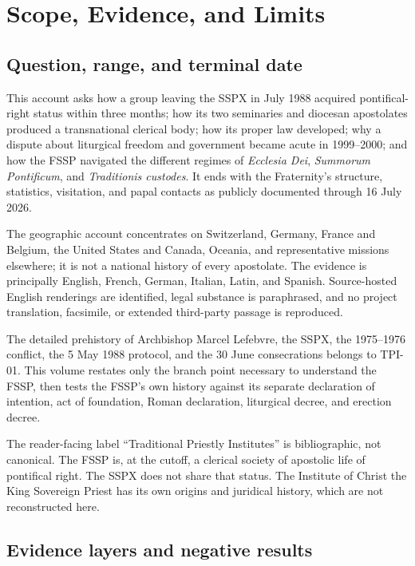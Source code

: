 \section{Scope, Evidence, and Limits}

\subsection{Question, range, and terminal date}

This account asks how a group leaving the SSPX in July 1988 acquired pontifical-right status within three months; how its two seminaries and diocesan apostolates produced a transnational clerical body; how its proper law developed; why a dispute about liturgical freedom and government became acute in 1999--2000; and how the FSSP navigated the different regimes of \emph{Ecclesia Dei}, \emph{Summorum Pontificum}, and \emph{Traditionis custodes}. It ends with the Fraternity's structure, statistics, visitation, and papal contacts as publicly documented through 16 July 2026.

The geographic account concentrates on Switzerland, Germany, France and Belgium, the United States and Canada, Oceania, and representative missions elsewhere; it is not a national history of every apostolate. The evidence is principally English, French, German, Italian, Latin, and Spanish. Source-hosted English renderings are identified, legal substance is paraphrased, and no project translation, facsimile, or extended third-party passage is reproduced.

The detailed prehistory of Archbishop Marcel Lefebvre, the SSPX, the 1975--1976 conflict, the 5 May 1988 protocol, and the 30 June consecrations belongs to TPI-01. This volume restates only the branch point necessary to understand the FSSP, then tests the FSSP's own history against its separate declaration of intention, act of foundation, Roman declaration, liturgical decree, and erection decree.

The reader-facing label ``Traditional Priestly Institutes'' is bibliographic, not canonical. The FSSP is, at the cutoff, a clerical society of apostolic life of pontifical right. The SSPX does not share that status. The Institute of Christ the King Sovereign Priest has its own origins and juridical history, which are not reconstructed here.

\subsection{Evidence layers and negative results}

